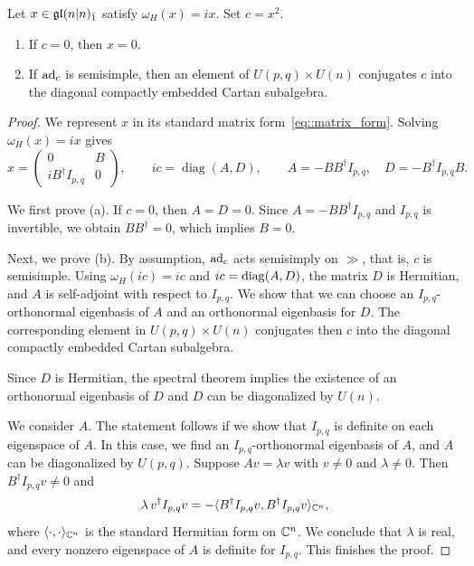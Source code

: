 \begin{lemma}\label{lemm::equal_rank_real_odd}
Let $x\in{\mathfrak{gl}}(n\vert n)_{\bar1}$ satisfy $\omega_H(x)=ix$. Set $c=x^2$.
\begin{enumerate}
\item[(a)] If $c=0$, then $x=0$.
\item[(b)] If $\operatorname{ad}_c$ is semisimple, then an element of
$U(p,q)\times U(n)$ conjugates $c$ into the diagonal compactly embedded
Cartan subalgebra.
\end{enumerate}
\end{lemma}

\begin{proof}
We represent $x$ in its standard matrix form~\eqref{eq::matrix_form}. Solving $\omega_H(x)=ix$ gives
\[
x=\begin{pmatrix}0&B\\iB^\dagger I_{p,q}&0\end{pmatrix},
\qquad
ic=\operatorname{diag}(A,D),
\qquad
A=-BB^\dagger I_{p,q},\quad
D=-B^\dagger I_{p,q}B.
\]

 We first prove (a). 
If $c=0$, then $A=D=0$. Since $A=-BB^\dagger I_{p,q}$ and $I_{p,q}$ is invertible, we obtain $BB^\dagger=0$, which implies $B=0$.

Next, we prove (b). By assumption, $\operatorname{ad}_{c}$ acts semisimply on $\gg$, that is, $c$ is semisimple. Using $\omega_{H}(ic)=ic$ and $ic=\operatorname{diag}(A,D)$, the matrix $D$ is Hermitian, and $A$ is
self-adjoint with respect to $I_{p,q}$. We show that we can choose an $I_{p,q}$-orthonormal eigenbasis of $A$ and an orthonormal eigenbasis for $D$. The corresponding element in $U(p,q)\times U(n)$ conjugates then $c$ into the diagonal compactly embedded Cartan subalgebra.

Since $D$ is Hermitian, the spectral theorem implies the existence of an orthonormal eigenbasis of $D$ and $D$ can be diagonalized by $U(n)$. 

We consider $A$. The statement follows if we show that $I_{p,q}$ is definite on each eigenspace of $A$. In this case, we find an $I_{p,q}$-orthonormal eigenbasis of $A$, and $A$ can be diagonalized by $U(p,q)$. Suppose $Av=\lambda v$ with $v\neq0$ and
$\lambda\neq0$. Then $B^\dagger I_{p,q}v\neq0$ and
\[
\lambda\,v^\dagger I_{p,q}v=-\langle B^\dagger I_{p,q}v,B^\dagger I_{p,q}v\rangle_{{\mathbb C}^{n}},
\]
where $\langle\cdot,\cdot\rangle_{{\mathbb C}^{n}}$ is the standard Hermitian form on ${\mathbb C}^{n}$. We conclude that $\lambda$ is real, and every nonzero eigenspace of $A$ is definite for
$I_{p,q}$. This finishes the proof.
\end{proof}

